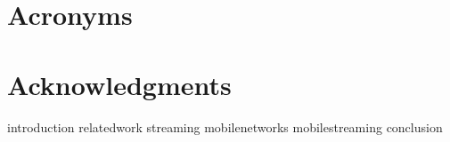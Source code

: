 \documentclass[openright,titlepage,numbers=noenddot,headinclude,footinclude=true,cleardoublepage=empty,BCOR=5mm,paper=A4,fontsize=11pt,twoside]{scrreprt}
\begin{document}




\newpage
{}
\tableofcontents

\newpage
{} %
{
\chapter*{Acronyms}

}

\newpage
{}
\listoffigures

\newpage
{}
\listoftables

\cleardoublepage


\cleardoublepage


\newtheorem{mydef}{Definition}
\cleardoublepage
\chapter*{Acknowledgments}

\cleardoublepage
{}


{introduction}
{relatedwork}
{streaming}
{mobilenetworks}
{mobilestreaming}
{conclusion}






\begingroup
\RaggedRight
\printbibliography
\endgroup

\end{document}
